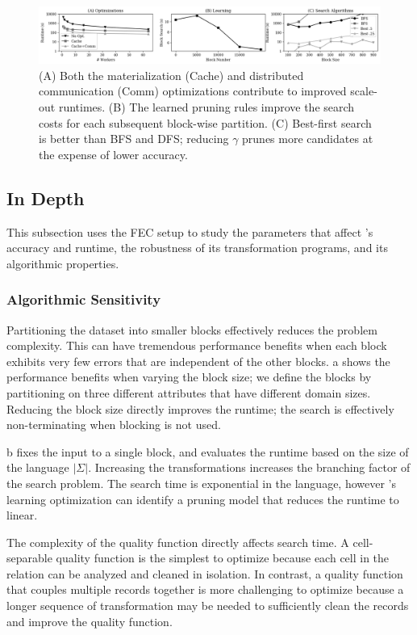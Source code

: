  \begin{figure}[t]
\centering
 \includegraphics[width=\textwidth]{exp/exp6.png}
 \caption{\small 
   (A) Both the materialization (Cache) and distributed communication (Comm) optimizations contribute to improved scale-out runtimes.
   (B) The learned pruning rules improve the search costs for each subsequent block-wise partition.  
   (C) Best-first search is better than BFS and DFS; reducing $\gamma$ prunes more candidates at the expense of lower accuracy.  
 \label{fig:opt}}
\end{figure}

\subsection{\sys In Depth}
This subsection uses the FEC setup to study the parameters that affect \sys's accuracy and runtime, the robustness of its transformation programs, and its algorithmic properties.

\subsubsection{Algorithmic Sensitivity}

 Partitioning the dataset into smaller blocks effectively reduces the problem complexity.  This can have tremendous performance benefits when each block exhibits very few errors that are independent of the other blocks.  a shows the performance benefits when varying the block size; we define the blocks by partitioning on three different attributes that have different domain sizes.  Reducing the block size directly improves the runtime; the search is effectively non-terminating when blocking is not used.    

 b fixes the input to a single block, and evaluates the runtime based on the size of the language $|\Sigma|$.  Increasing the transformations increases the branching factor of the search problem. The search time is exponential in the language, however \sys's learning optimization can identify a pruning model that reduces the runtime to linear.

 The complexity of the quality function directly affects search time.  A cell-separable quality function is the simplest to optimize because each cell in the relation can be analyzed and cleaned in isolation.  In contrast, a quality function that couples multiple records together is more challenging to optimize because a longer sequence of transformation may be needed to sufficiently clean the records and improve the quality function.  

